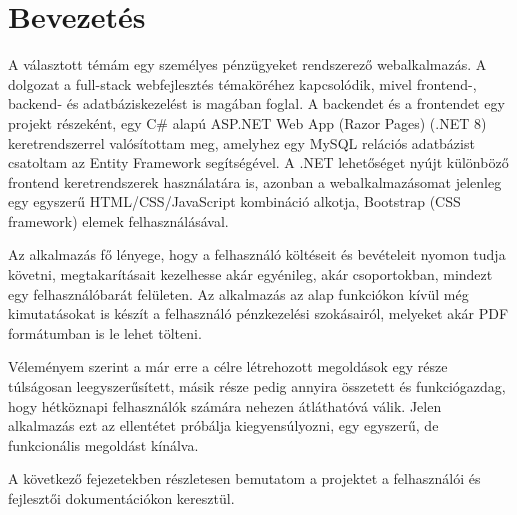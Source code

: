 \chapter{Bevezetés}
\label{ch:intro}

A választott témám egy személyes pénzügyeket rendszerező webalkalmazás. A dolgozat a full-stack webfejlesztés témaköréhez kapcsolódik, mivel frontend-, backend- és adatbáziskezelést is magában foglal. A backendet és a frontendet egy projekt részeként, egy C\# alapú ASP.NET Web App (Razor Pages) (.NET 8) keretrendszerrel valósítottam meg, amelyhez egy MySQL relációs adatbázist csatoltam az Entity Framework segítségével. A .NET lehetőséget nyújt különböző frontend keretrendszerek használatára is, azonban a webalkalmazásomat jelenleg egy egyszerű HTML/CSS/JavaScript kombináció alkotja, Bootstrap (CSS framework) elemek felhasználásával.

Az alkalmazás fő lényege, hogy a felhasználó költéseit és bevételeit nyomon tudja követni, megtakarításait kezelhesse akár egyénileg, akár csoportokban, mindezt egy felhasználóbarát felületen. Az alkalmazás az alap funkciókon kívül még kimutatásokat is készít a felhasználó pénzkezelési szokásairól, melyeket akár PDF formátumban is le lehet tölteni.


Véleményem szerint a már erre a célre létrehozott megoldások egy része túlságosan leegyszerűsített, másik része pedig annyira összetett és funkciógazdag, hogy hétköznapi felhasználók számára nehezen átláthatóvá válik. Jelen alkalmazás ezt az ellentétet próbálja kiegyensúlyozni, egy egyszerű, de funkcionális megoldást kínálva.


A következő fejezetekben részletesen bemutatom a projektet a felhasználói és fejlesztői dokumentációkon keresztül.
